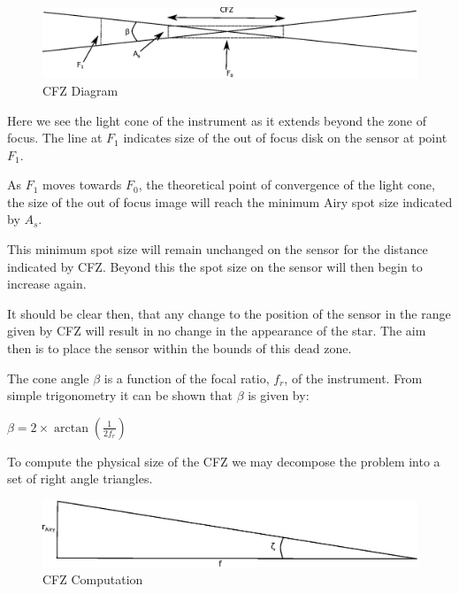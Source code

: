 \documentclass[11pt]{article}
\begin{document}
\begin{figure}[htb]
	\begin{center}
		\includegraphics[scale=0.7]{./images/CFZ.eps}
		\caption{CFZ Diagram}
		\label{fig:cfz}
	\end{center}
\end{figure}

Here we see the light cone of the instrument as it extends beyond the zone of focus.  The line at $F_{1}$ indicates size of the out of focus disk on the sensor at point $F_{1}$.  

As $F_{1}$ moves towards $F_{0}$, the theoretical point of convergence of the light cone, the size of the out of focus image will reach the minimum Airy spot size indicated by $A_{s}$.  

This minimum spot size will remain unchanged on the sensor for the distance indicated by CFZ. Beyond this the spot size on the sensor will then begin to increase again.  

It should be clear then, that any change to the position of the sensor in the range given by CFZ will result in no change in the appearance of the star.  The aim then is to place the sensor within the bounds of this dead zone.

The cone angle $\beta$ is a function of the focal ratio, $f_{r}$, of the instrument.  From simple trigonometry it can be shown that $\beta$ is given by:

$\beta=2\times\arctan(\frac{1}{2f_{r}})$

To compute the physical size of the CFZ we may decompose the problem into a set of right angle triangles.

\begin{figure}[htb]
	\begin{center}
		\includegraphics[]{./images/CFZ-computation.eps}
		\caption{CFZ Computation}
		\label{fig:cfz-computation}
	\end{center}
\end{figure}
\end{document}
